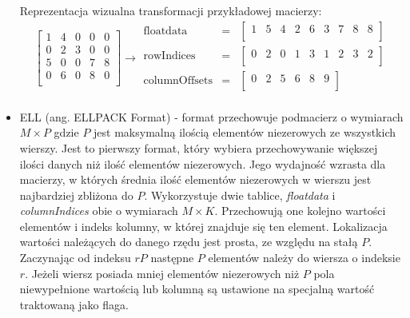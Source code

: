 \begin{itemize}
    Reprezentacja wizualna transformacji przykładowej macierzy:
    \[
\left[
\begin{array}{ccccc}
    1 & 4 & 0 & 0 & 0\\ 
    0 & 2 & 3 & 0 & 0\\ 
    5 & 0 & 0 & 7 & 8\\ 
    0 & 6 & 0 & 8 & 0\\ 
\end{array}
\right]
\rightarrow
\begin{matrix}
\text{floatdata} & = & \begin{bmatrix}
1 & 5 & 4 & 2 & 6 & 3 & 7 & 8 & 8 \\
\end{bmatrix} \\
\text{rowIndices} & = & \begin{bmatrix}
0 & 2 & 0 & 1 & 3 & 1 & 2 & 3 & 2 \\
\end{bmatrix} \\
\text{columnOffsets} & = & \begin{bmatrix}
0 & 2 & 5 & 6 & 8 & 9 \\
\end{bmatrix} \\
\end{matrix}
\]
    
    \item ELL (ang. ELLPACK Format) - format przechowuje podmacierz o wymiarach $M \times P$ gdzie $P$ jest maksymalną ilością elementów niezerowych ze wszystkich wierszy. 
    Jest to pierwszy format, który wybiera przechowywanie większej ilości danych niż ilość elementów niezerowych.
    Jego wydajność wzrasta dla macierzy, w których średnia ilość elementów niezerowych w wierszu jest najbardziej zbliżona do $P$.
    Wykorzystuje dwie tablice, \textit{floatdata} i \textit{columnIndices} obie o wymiarach $M \times K$.
    Przechowują one kolejno wartości elementów i indeks kolumny, w której znajduje się ten element.
    Lokalizacja wartości należących do danego rzędu jest prosta, ze względu na stałą $P$.
    Zaczynając od indeksu $rP$ następne $P$ elementów należy do wiersza o indeksie $r$.
    Jeżeli wiersz posiada mniej elementów niezerowych niż $P$ pola niewypełnione wartością lub kolumną są ustawione na specjalną wartość traktowaną jako flaga.
    

\end{itemize}
